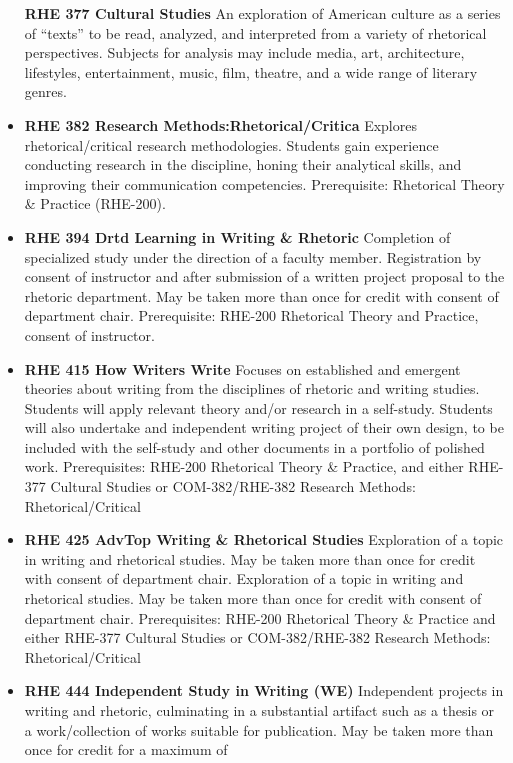 \documentclass[
  letterpaper,
]{scrbook}
\begin{document}
\begin{itemize}
  \textbf{RHE 377 Cultural Studies} An exploration of American culture
  as a series of ``texts'' to be read, analyzed, and interpreted from a
  variety of rhetorical perspectives. Subjects for analysis may include
  media, art, architecture, lifestyles, entertainment, music, film,
  theatre, and a wide range of literary genres.\\
\item
  \textbf{RHE 382 Research Methods:Rhetorical/Critica} Explores
  rhetorical/critical research methodologies. Students gain experience
  conducting research in the discipline, honing their analytical skills,
  and improving their communication competencies. Prerequisite:
  Rhetorical Theory \& Practice (RHE-200).
\item
  \textbf{RHE 394 Drtd Learning in Writing \& Rhetoric} Completion of
  specialized study under the direction of a faculty member.
  Registration by consent of instructor and after submission of a
  written project proposal to the rhetoric department. May be taken more
  than once for credit with consent of department chair. Prerequisite:
  RHE-200 Rhetorical Theory and Practice, consent of instructor.
\item
  \textbf{RHE 415 How Writers Write} Focuses on established and emergent
  theories about writing from the disciplines of rhetoric and writing
  studies. Students will apply relevant theory and/or research in a
  self-study. Students will also undertake and independent writing
  project of their own design, to be included with the self-study and
  other documents in a portfolio of polished work. Prerequisites:
  RHE-200 Rhetorical Theory \& Practice, and either RHE-377 Cultural
  Studies or COM-382/RHE-382 Research Methods: Rhetorical/Critical\\
\item
  \textbf{RHE 425 AdvTop Writing \& Rhetorical Studies} Exploration of a
  topic in writing and rhetorical studies. May be taken more than once
  for credit with consent of department chair. Exploration of a topic in
  writing and rhetorical studies. May be taken more than once for credit
  with consent of department chair. Prerequisites: RHE-200 Rhetorical
  Theory \& Practice and either RHE-377 Cultural Studies or
  COM-382/RHE-382 Research Methods: Rhetorical/Critical
\item
  \textbf{RHE 444 Independent Study in Writing (WE)} Independent
  projects in writing and rhetoric, culminating in a substantial
  artifact such as a thesis or a work/collection of works suitable for
  publication. May be taken more than once for credit for a maximum of

\end{itemize}
\end{document}
